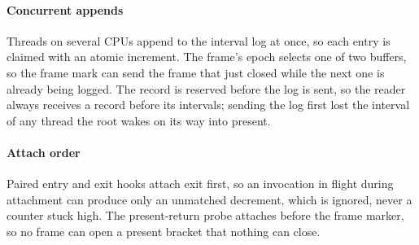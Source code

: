 \paragraph{Concurrent appends} Threads on several CPUs append to the interval log
at once, so each entry is claimed with an atomic increment. The frame's
epoch selects one of two buffers, so the frame mark can send the frame that
just closed while the next one is already being logged. The record is
reserved before the log is sent, so the reader always receives a record
before its intervals; sending the log first lost the interval of any thread
the root wakes on its way into present.

\paragraph{Attach order} Paired entry and exit hooks attach exit first, so an
invocation in flight during attachment can produce only an unmatched
decrement, which is ignored, never a counter stuck high. The present-return
probe attaches before the frame marker, so no frame can open a present
bracket that nothing can close.
